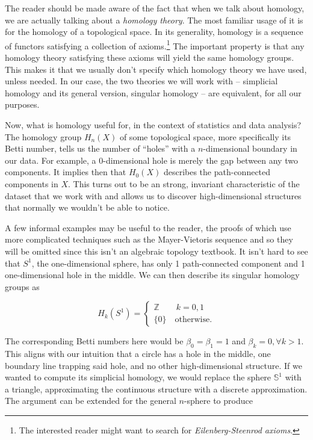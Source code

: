 The reader should be made aware of the fact that when we talk about homology, we are actually talking about a \textit{homology theory}. The most familiar usage of it is for the homology of a topological space. In its generality, homology is a sequence of functors satisfying a collection of axioms.\footnote{The interested reader might want to search for \textit{Eilenberg-Steenrod axioms}.} The important property is that any homology theory satisfying these axioms will yield the same homology groups. This makes it that we usually don't specify which homology theory we have used, unless needed. In our case, the two theories we will work with -- simplicial homology and its general version, singular homology -- are equivalent, for all our purposes.

Now, what is homology useful for, in the context of statistics and data analysis? The homology group $H_{n}(X)$ of some topological space, more specifically its Betti number, tells us the number of ``holes'' with a $n$-dimensional boundary in our data. For example, a $0$-dimensional hole is merely the gap between any two components. It implies then that $H_{0}(X)$ describes the path-connected components in $X$. This turns out to be an strong, invariant characteristic of the dataset that we work with and allows us to discover high-dimensional structures that normally we wouldn't be able to notice.

A few informal examples may be useful to the reader, the proofs of which use more complicated techniques such as the Mayer-Vietoris sequence and so they will be omitted since this isn't an algebraic topology textbook. It isn't hard to see that $S^{1}$, the one-dimensional sphere, has only 1 path-connected component and 1 one-dimensional hole in the middle. We can then describe its singular homology groups as

\begin{equation*}
  H_{k}(S^{1}) = \begin{cases}
    \mathbb{Z} \qquad k = 0,1 \\
    \{0\} \quad \text{otherwise}.
  \end{cases}
\end{equation*}

The corresponding Betti numbers here would be $\beta_{0} = \beta_{1} = 1$ and $\beta_{k} = 0, \forall k > 1$. This aligns with our intuition that a circle has a hole in the middle, one boundary line trapping said hole, and no other high-dimensional structure. If we wanted to compute its simplicial homology, we would replace the sphere $\mathbb{S}^{1}$ with a triangle, approximating the continuous structure with a discrete approximation. The argument can be extended for the general $n$-sphere to produce

